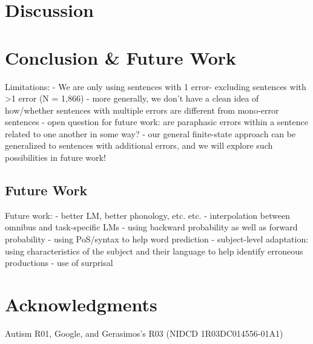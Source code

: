 \documentclass[11pt,letterpaper]{article}
\begin{document}

\section{Discussion} %
\label{sec:discussion}


\section{Conclusion \& Future Work} %
\label{sec:conclusions}

Limitations:
    - We are only using sentences with 1 error- excluding sentences with >1 error (N = 1,866)
    - more generally, we don't have a clean idea of how/whether sentences with multiple errors are different from mono-error sentences
        - open question for future work: are paraphasic errors within a sentence related to one another in some way?
        - our general finite-state approach can be generalized to sentences with additional errors, and we will explore such possibilities in future work!

\subsection{Future Work} %
\label{sub:future_work}

Future work:
    - better LM, better phonology, etc. etc.
        - interpolation between omnibus and task-specific LMs
        - using backward probability as well as forward probability
    - using PoS/syntax to help word prediction
    - subject-level adaptation: using characteristics of the subject and their language to help identify erroneous productions
    - use of surprisal




\section*{Acknowledgments}

Autism R01, Google, and Gerasimos's R03 (NIDCD 1R03DC014556-01A1)




\end{document}
